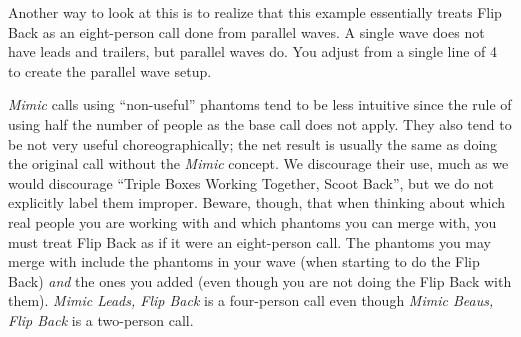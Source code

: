 \documentclass[12pt]{article}
\begin{document}
Another way to look at this is to realize that this example essentially treats
Flip Back as an eight-person call done from parallel waves.
A single wave does not have leads and trailers, but parallel
waves do.  You adjust from a single line of 4 to create the
parallel wave setup.

\emph{Mimic} calls using ``non-useful'' phantoms
tend to be less intuitive since
the rule of using half the number of people as the base call does not
apply.  They also tend to be not very useful choreographically;
the net result is usually the same as doing the original call
without the \emph{Mimic} concept.  We discourage their use,
much as we would discourage ``Triple Boxes Working Together, Scoot Back'',
but we do not explicitly label them improper.  Beware, though,
that when thinking about which real people you are working with
and which phantoms you can merge with, you must treat Flip Back as if
it were an eight-person call.  The phantoms you may merge with include
the phantoms in your wave (when starting to do the Flip Back) \emph{and}
the ones you added (even though you are not doing the Flip Back with
them).  \emph{Mimic Leads, Flip Back} is a four-person call even though
\emph{Mimic Beaus, Flip Back} is a two-person call.

% 
% 
% 
% 
\end{document}
